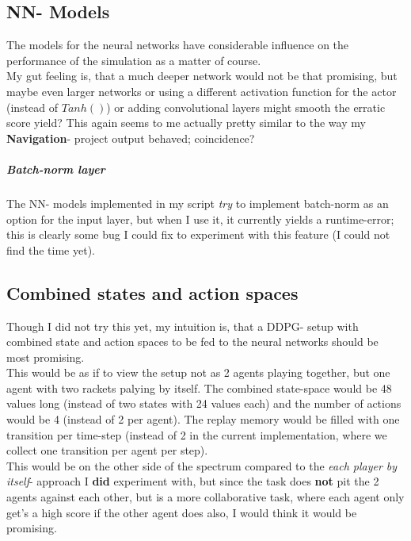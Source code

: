\documentclass[a4paper]{article}
\begin{document}
\subsection{NN- Models}
The models for the neural networks have considerable influence on the
performance of the simulation as a matter of course.
\\
My gut feeling is, that a much deeper network would not be that promising,
but maybe even larger networks or using a different activation function
for the actor (instead of $Tanh()$) or adding convolutional layers might smooth
the erratic score yield? This again seems to me actually pretty similar to the
way my \textbf{Navigation}- project output behaved; coincidence?

\subparagraph{Batch-norm layer}
The NN- models implemented in my script \textit{try} to implement batch-norm
as an option for the input layer, but when I use it, it currently yields
a runtime-error; this is clearly some bug I could fix to experiment with
this feature (I could not find the time yet).

\subsection{Combined states and action spaces}
Though I did not try this yet, my intuition is, that a DDPG- setup with combined
state and action spaces to be fed to the neural networks should be most promising.\\
This would be as if to view the setup not as 2 agents playing together, but one
agent with two rackets palying by itself. The combined state-space would be
48 values long (instead of two states with 24 values each) and the number of
actions would be 4 (instead of 2 per agent). The replay memory would be filled with one transition
per time-step (instead of 2 in the current implementation, where we collect
one transition per agent per step).
\\
This would be on the other side of the spectrum compared to the \textit{each player
by itself}- approach I \textbf{did} experiment with, but since the task does \textbf{not}
pit the 2 agents against each other, but is a more collaborative task, where
each agent only get's a high score if the other agent does also, I would think
it would be promising.
\end{document}

